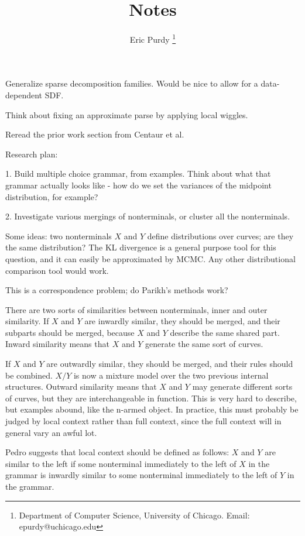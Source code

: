 \documentclass{article}
\title{Notes}
\author{Eric Purdy \footnote{Department of Computer Science, University of Chicago. Email: epurdy@uchicago.edu}}
\begin{document}
\maketitle
\bitem

\item Generalize sparse decomposition families. Would be nice to allow
  for a data-dependent SDF.

\item Think about fixing an approximate parse by applying local wiggles.

\item Reread the prior work section from Centaur et al.

\item Research plan:

1. Build multiple choice grammar, from examples. Think about what that
grammar actually looks like - how do we set the variances of the
midpoint distribution, for example?

2. Investigate various mergings of nonterminals, or cluster all the nonterminals.

Some ideas: two nonterminals $X$ and $Y$ define distributions over
curves; are they the same distribution? The KL divergence is a general
purpose tool for this question, and it can easily be approximated by
MCMC. Any other distributional comparison tool would work.

This is a correspondence problem; do Parikh's methods work?

There are two sorts of similarities between nonterminals, inner and
outer similarity. If $X$ and $Y$ are inwardly similar, they should be
merged, and their subparts should be merged, because $X$ and $Y$
describe the same shared part. Inward similarity means that $X$ and
$Y$ generate the same sort of curves. 

If $X$ and $Y$ are outwardly similar, they should be merged, and their
rules should be combined. $X/Y$ is now a mixture model over the two
previous internal structures. Outward similarity means that $X$ and
$Y$ may generate different sorts of curves, but they are
interchangeable in function. This is very hard to describe, but
examples abound, like the n-armed object. In practice, this must
probably be judged by local context rather than full context, since
the full context will in general vary an awful lot.

Pedro suggests that local context should be defined as follows: $X$
and $Y$ are similar to the left if some nonterminal immediately to the
left of $X$ in the grammar is inwardly similar to some nonterminal
immediately to the left of $Y$ in the grammar.
\end{document}
